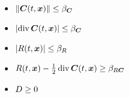 \begin{frame}
\begin{multicols}{2}
\begin{center}
            \begin{minipage}{0.4\textwidth}
                \begin{itemize}
                    \item $\left\lVert \bm{C}(t, \bm{x}) \right\rVert \leq \beta_{\bm{C}}$
                    \item $\left\lvert \operatorname*{div} \bm{C}(t, \bm{x}) \right\rvert \leq \beta_{\bm{C}}$
                    \item $\left\lvert R(t, \bm{x}) \right\rvert \leq \beta_{R}$
                    \item $R(t, \bm{x}) - \frac{1}{2} \operatorname*{div} \bm{C}(t, \bm{x}) \geq \beta_{R \bm{C}}$
                    \item $D \geq 0$
                \end{itemize}
            \end{minipage}
        \end{center}
    \end{multicols}
    \vspace*{\fill}
    
\end{frame}


